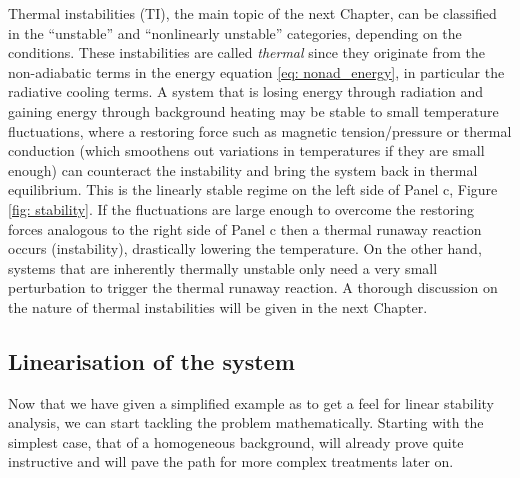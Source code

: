 Thermal instabilities (TI), the main topic of the next Chapter, can be classified in the ``unstable'' and ``nonlinearly unstable'' categories, depending on the conditions. These instabilities are called \emph{thermal} since they originate from the non-adiabatic terms in the energy equation \eqref{eq: nonad_energy}, in particular the radiative cooling terms. A system that is losing energy through radiation and gaining energy through background heating may be stable to small temperature fluctuations, where a restoring force such as magnetic tension/pressure or thermal conduction (which smoothens out variations in temperatures if they are small enough) can counteract the instability and bring the system back in thermal equilibrium. This is the linearly stable regime on the left side of Panel c, Figure \ref{fig: stability}. If the fluctuations are large enough to overcome the restoring forces analogous to the right side of Panel c then a thermal runaway reaction occurs (instability), drastically lowering the temperature. On the other hand, systems that are inherently thermally unstable only need a very small perturbation to trigger the thermal runaway reaction. A thorough discussion on the nature of thermal instabilities will be given in the next Chapter.

\subsection{Linearisation of the system}
Now that we have given a simplified example as to get a feel for linear stability analysis, we can start tackling the problem mathematically. Starting with the simplest case, that of a homogeneous background, will already prove quite instructive and will pave the path for more complex treatments later on.

